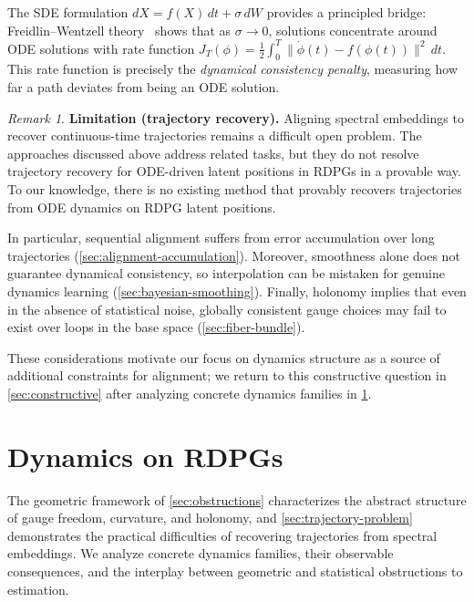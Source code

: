 \documentclass{article}
\theoremstyle{plain}
\theoremstyle{definition}
\theoremstyle{remark}
\newtheorem*{remark}{Remark}
\begin{document}
The SDE formulation $dX = f(X)\,dt + \sigma\,dW$ provides a principled bridge: Freidlin--Wentzell theory~\citep{freidlin1998random} shows that as $\sigma \to 0$, solutions concentrate around ODE solutions with rate function $J_T(\phi) = \frac{1}{2} \int_0^T \|\dot{\phi}(t) - f(\phi(t))\|^2 \, dt$.
This rate function is precisely the \emph{dynamical consistency penalty}, measuring how far a path deviates from being an ODE solution.

\begin{remark}
\textbf{Limitation (trajectory recovery).} Aligning spectral embeddings to recover continuous-time trajectories remains a difficult open problem.
The approaches discussed above address related tasks, but they do not resolve trajectory recovery for ODE-driven latent positions in RDPGs in a provable way.
To our knowledge, there is no existing method that provably recovers trajectories from ODE dynamics on RDPG latent positions.

In particular, sequential alignment suffers from error accumulation over long trajectories (\cref{sec:alignment-accumulation}).
Moreover, smoothness alone does not guarantee dynamical consistency, so interpolation can be mistaken for genuine dynamics learning (\cref{sec:bayesian-smoothing}).
Finally, holonomy implies that even in the absence of statistical noise, globally consistent gauge choices may fail to exist over loops in the base space (\cref{sec:fiber-bundle}).

These considerations motivate our focus on dynamics structure as a source of additional constraints for alignment; we return to this constructive question in \cref{sec:constructive} after analyzing concrete dynamics families in \cref{sec:dynamics}.
\end{remark}



\section{Dynamics on RDPGs}\label{sec:dynamics}

The geometric framework of \cref{sec:obstructions} characterizes the abstract structure of gauge freedom, curvature, and holonomy, and \cref{sec:trajectory-problem} demonstrates the practical difficulties of recovering trajectories from spectral embeddings.
We analyze concrete dynamics families, their observable consequences, and the interplay between geometric and statistical obstructions to estimation.
\end{document}
